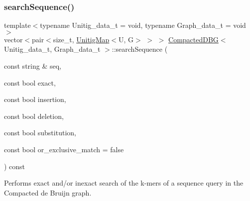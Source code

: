 \subsubsection{\texorpdfstring{search\+Sequence()}{searchSequence()}}
{\footnotesize\ttfamily template$<$typename Unitig\+\_\+data\+\_\+t = void, typename Graph\+\_\+data\+\_\+t = void$>$ \\
vector$<$pair$<$size\+\_\+t, \hyperlink{classUnitigMap}{Unitig\+Map}$<$U, G$>$ $>$ $>$ \hyperlink{classCompactedDBG}{Compacted\+D\+BG}$<$ Unitig\+\_\+data\+\_\+t, Graph\+\_\+data\+\_\+t $>$\+::search\+Sequence (\begin{DoxyParamCaption}\item[{const string \&}]{seq,  }\item[{const bool}]{exact,  }\item[{const bool}]{insertion,  }\item[{const bool}]{deletion,  }\item[{const bool}]{substitution,  }\item[{const bool}]{or\+\_\+exclusive\+\_\+match = {\ttfamily false} }\end{DoxyParamCaption}) const}



Performs exact and/or inexact search of the k-\/mers of a sequence query in the Compacted de Bruijn graph. 


